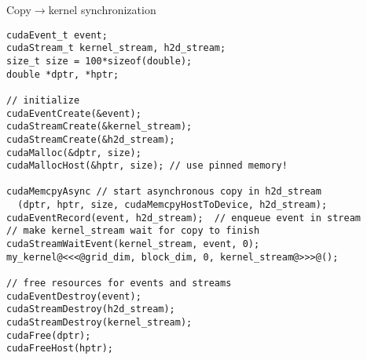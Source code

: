\begin{frame}[fragile]{}
    \begin{code}{Copy$\rightarrow$kernel synchronization}
        \begin{lstlisting}[style=boxcudatiny]
cudaEvent_t event;
cudaStream_t kernel_stream, h2d_stream;
size_t size = 100*sizeof(double);
double *dptr, *hptr;

// initialize
cudaEventCreate(&event);
cudaStreamCreate(&kernel_stream);
cudaStreamCreate(&h2d_stream);
cudaMalloc(&dptr, size);
cudaMallocHost(&hptr, size); // use pinned memory!

cudaMemcpyAsync // start asynchronous copy in h2d_stream
  (dptr, hptr, size, cudaMemcpyHostToDevice, h2d_stream);
cudaEventRecord(event, h2d_stream);  // enqueue event in stream
// make kernel_stream wait for copy to finish
cudaStreamWaitEvent(kernel_stream, event, 0);
my_kernel@<<<@grid_dim, block_dim, 0, kernel_stream@>>>@();

// free resources for events and streams
cudaEventDestroy(event);
cudaStreamDestroy(h2d_stream);
cudaStreamDestroy(kernel_stream);
cudaFree(dptr);
cudaFreeHost(hptr);
        \end{lstlisting}
    \end{code}
\end{frame}

